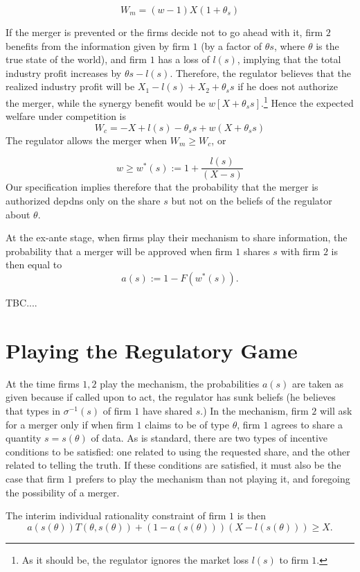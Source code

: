 \documentclass[a4paper]{article}
\renewcommand{\t}{\theta}
\begin{document}
    $$W_m=(w-1)X(1+\t_s)$$
    
    If the merger is prevented or the firms decide not to go ahead with it, firm $2$ benefits from the information given by firm $1$ (by a factor of $\t s$, where $\t$ is the true state of the world), and firm $1$ has a loss of $l(s)$, implying that the total industry profit increases by $\t s -l(s)$. Therefore, the regulator believes that the realized industry profit will be $X_1-l(s)+X_2+\t_s s$   if he does not authorize the merger, while the synergy benefit would be $w[X+\t_s s]$.\footnote{%
    As it should be, the regulator ignores the market loss $l(s)$ to firm $1$.} Hence the expected welfare under competition is
      $$W_c=-X+l(s)-\t_s s + w (X+\t_s s)$$
   The regulator allows the merger when $W_m\geq W_c$, or
    
    \begin{equation}
           w\geq w^*(s):=1 + \frac{l(s)}{(X-s)}
    \end{equation}
%
Our specification implies therefore that the probability that the merger is authorized depdns only on the share $s$ but not on the beliefs of the regulator about $\t$.

At the ex-ante stage, when firms play their mechanism to share information, the probability that a merger will be approved when firm $1$ shares $s$ with firm $2$ is then equal to  
\[
a(s):=1-F(w^*(s)).
\]

TBC....

\section{Playing the Regulatory Game}
At the time firms $1,2$ play the mechanism, the probabilities $a(s)$  are taken as given because if called upon to act, the regulator has sunk beliefs (he believes that types in $\sigma^{-1}(s)$ of firm $1$ have shared $s$.) In the mechanism, firm $2$ will ask for a merger only if when firm $1$ claims to be of type $\t$, firm $1$ agrees to share a quantity $s=s(\t)$ of data. As is standard, there are two types of incentive conditions to be satisfied: one related to using the requested share, and the other related to telling the truth. If these conditions are satisfied, it must also be the case that firm $1$ prefers to play the mechanism than not playing it, and foregoing the possibility of a merger. 

The interim individual rationality constraint of firm $1$ is then
\begin{equation}\label{cond:IR}
    a(s(\t))T(\t,s(\t))+(1-a(s(\t)))(X-l(s(\t)))\geq X.   
\end{equation}
\end{document}
